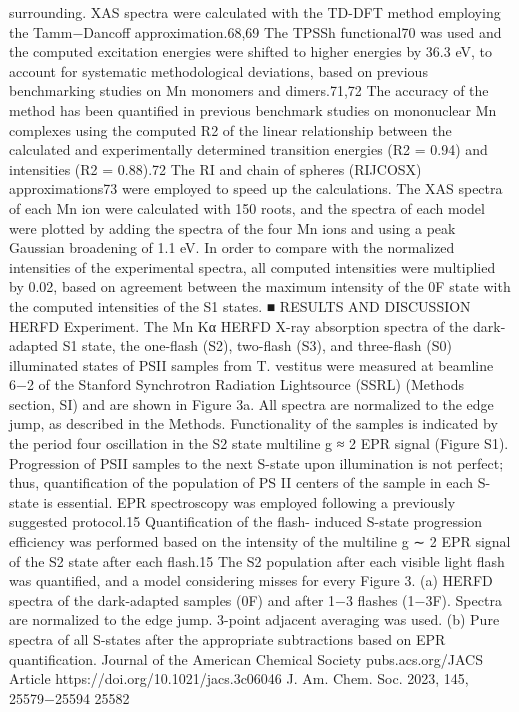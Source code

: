\documentclass{article}
\begin{document}
surrounding.
XAS spectra were calculated with the TD-DFT method
employing the Tamm−Dancoff approximation.68,69 The
TPSSh functional70 was used and the computed excitation
energies were shifted to higher energies by 36.3 eV, to account
for systematic methodological deviations, based on previous
benchmarking studies on Mn monomers and dimers.71,72 The
accuracy of the method has been quantified in previous
benchmark studies on mononuclear Mn complexes using the
computed R2 of the linear relationship between the calculated
and experimentally determined transition energies (R2 = 0.94)
and intensities (R2 = 0.88).72 The RI and chain of spheres
(RIJCOSX) approximations73 were employed to speed up the
calculations. The XAS spectra of each Mn ion were calculated
with 150 roots, and the spectra of each model were plotted by
adding the spectra of the four Mn ions and using a peak
Gaussian broadening of 1.1 eV. In order to compare with the
normalized intensities of the experimental spectra, all
computed intensities were multiplied by 0.02, based on
agreement between the maximum intensity of the 0F state
with the computed intensities of the S1 states.
■ RESULTS AND DISCUSSION
HERFD Experiment. The Mn Kα HERFD X-ray
absorption spectra of the dark-adapted S1 state, the one-flash
(S2), two-flash (S3), and three-flash (S0) illuminated states of
PSII samples from T. vestitus were measured at beamline 6−2
of the Stanford Synchrotron Radiation Lightsource (SSRL)
(Methods section, SI) and are shown in Figure 3a. All spectra
are normalized to the edge jump, as described in the Methods.
Functionality of the samples is indicated by the period four
oscillation in the S2 state multiline g ≈ 2 EPR signal (Figure
S1).
Progression of PSII samples to the next S-state upon
illumination is not perfect; thus, quantification of the
population of PS II centers of the sample in each S-state is
essential. EPR spectroscopy was employed following a
previously suggested protocol.15 Quantification of the flash-
induced S-state progression efficiency was performed based on
the intensity of the multiline g ∼ 2 EPR signal of the S2 state
after each flash.15 The S2 population after each visible light
flash was quantified, and a model considering misses for every
Figure 3. (a) HERFD spectra of the dark-adapted samples (0F) and after 1−3 flashes (1−3F). Spectra are normalized to the edge jump. 3-point
adjacent averaging was used. (b) Pure spectra of all S-states after the appropriate subtractions based on EPR quantification.
Journal of the American Chemical Society
pubs.acs.org/JACS
Article
https://doi.org/10.1021/jacs.3c06046
J. Am. Chem. Soc. 2023, 145, 25579−25594
25582
\end{document}
